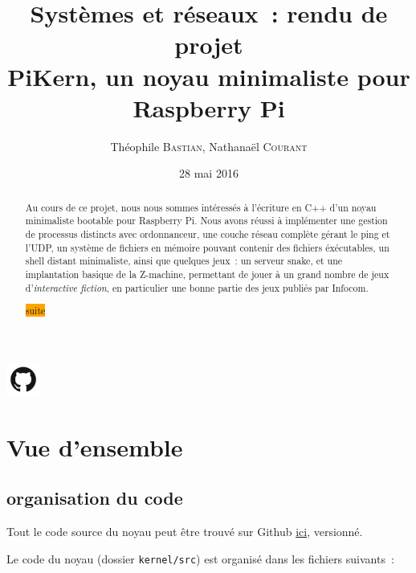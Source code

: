 \documentclass[11pt,a4paper]{article}
\author{Théophile \textsc{Bastian}, Nathanaël \textsc{Courant}}
\title{Systèmes et réseaux~: rendu de projet\\
{\small PiKern, un noyau minimaliste pour Raspberry Pi}}
\date{28 mai 2016}
\newcommand{\todo}[1]{\colorbox{orange}{\color{blue}{\Large TODO:} #1}}
\begin{document}
\maketitle

\begin{abstract}
Au cours de ce projet, nous nous sommes intéressés à l'écriture en C++ d'un
noyau minimaliste bootable pour Raspberry Pi. Nous avons réussi à implémenter
une gestion de processus distincts avec ordonnanceur, une couche réseau
complète gérant le ping et l'UDP, un système de fichiers en mémoire
pouvant contenir des fichiers éxécutables, un shell distant
minimaliste, ainsi que quelques jeux~: un serveur snake, et une
implantation basique de la Z-machine, permettant de jouer à un grand
nombre de jeux d'\textit{interactive fiction}, en particulier une
bonne partie des jeux publiés par Infocom.

	\todo{suite}
\end{abstract}

\begin{center}
	\href{https://github.com/tobast/sysres-pikern}
		{\Large \includegraphics[height=3em]{github.png}
		}
\end{center}

\tableofcontents
\newpage

\section{Vue d'ensemble}

\subsection{organisation du code}

Tout le code source du noyau peut être trouvé sur Github
\href{https://github.com/tobast/sysres-pikern}{ici}, versionné.

Le code du noyau (dossier \texttt{kernel/src}) est organisé dans les fichiers
suivants~:
\end{document}
